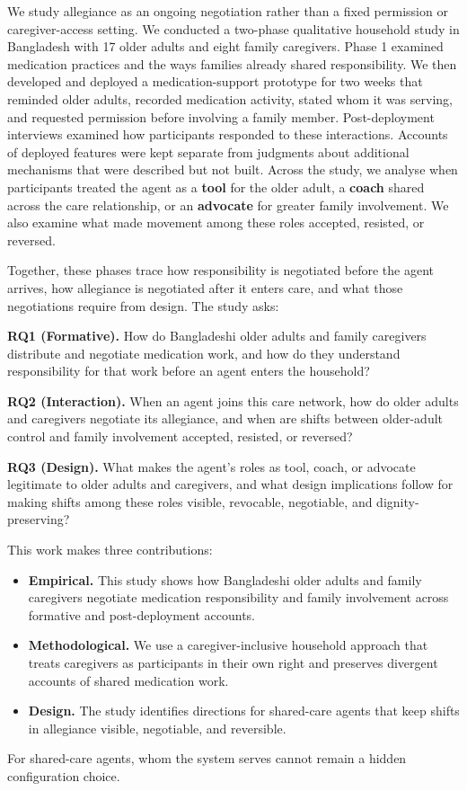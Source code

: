 We study allegiance as an ongoing negotiation rather than a fixed permission or caregiver-access setting. We conducted a two-phase qualitative household study in Bangladesh with 17 older adults and eight family caregivers. Phase 1 examined medication practices and the ways families already shared responsibility. We then developed and deployed a medication-support prototype for two weeks that reminded older adults, recorded medication activity, stated whom it was serving, and requested permission before involving a family member. Post-deployment interviews examined how participants responded to these interactions. Accounts of deployed features were kept separate from judgments about additional mechanisms that were described but not built. Across the study, we analyse when participants treated the agent as a \textbf{tool} for the older adult, a \textbf{coach} shared across the care relationship, or an \textbf{advocate} for greater family involvement. We also examine what made movement among these roles accepted, resisted, or reversed.

Together, these phases trace how responsibility is negotiated before the agent arrives, how allegiance is negotiated after it enters care, and what those negotiations require from design. The study asks:

\textbf{RQ1 (Formative).} How do Bangladeshi older adults and family caregivers distribute and negotiate medication work, and how do they understand responsibility for that work before an agent enters the household?

\textbf{RQ2 (Interaction).} When an agent joins this care network, how do older adults and caregivers negotiate its allegiance, and when are shifts between older-adult control and family involvement accepted, resisted, or reversed?

\textbf{RQ3 (Design).} What makes the agent's roles as tool, coach, or advocate legitimate to older adults and caregivers, and what design implications follow for making shifts among these roles visible, revocable, negotiable, and dignity-preserving?

This work makes three contributions:

\begin{itemize}
  \item \textbf{Empirical.} This study shows how Bangladeshi older adults and family caregivers negotiate medication responsibility and family involvement across formative and post-deployment accounts.
  \item \textbf{Methodological.} We use a caregiver-inclusive household approach that treats caregivers as participants in their own right and preserves divergent accounts of shared medication work.
  \item \textbf{Design.} The study identifies directions for shared-care agents that keep shifts in allegiance visible, negotiable, and reversible.
\end{itemize}

For shared-care agents, whom the system serves cannot remain a hidden configuration choice.

